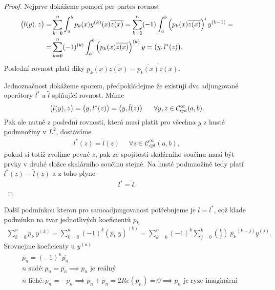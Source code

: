 \begin{proof}
Nejprve dokážeme pomocí per partes rovnost
\begin{align*}
\begin{split}
    \big( l(y), z \big) =& \sum_{k=0}^{n} \int_a^b p_k(x) y^{(k)}(x) \overline{z(x)} =
    \sum_{k=0}^{n} (-1) \int_a^b \left(p_k(x) \overline{z(x)}\right)' y^{(k-1)} = \\
    =& \sum_{k=0}^{n} (-1)^{(k)} \int_a^b \left(p_k(x) \overline{z(x)}\right)^{(k)} y =
    \big( y, l^*(z) \big).
\end{split}
\end{align*}
Poslední rovnost platí díky $p_k(x) \overline{z(x)}= \overline{\overline{p_k(x)} z(x)}$.

Jednoznačnost dokážeme sporem, předpokládejme že existují dva adjungované operátory $l^*$ a $\tilde{l}$ splňující rovnost. Máme
\begin{align*}
    \big( l(y), z \big) = \big( y, l^*(z) \big) = \big( y, \tilde{l}(z) \big) ~ ~ ~ ~ ~ \forall y, z \in \mathcal{C}^{\infty}_{cpt} (a,b).
\end{align*}
Pak ale nutně z poslední rovnosti, která musí platit pro všechna $y$ z husté podmnožiny v $L^2$, dostáváme
\begin{align*}
    l^*(z) = \tilde{l}(z) ~ ~ ~ ~ ~ ~ \forall z \in \mathcal{C}^{\infty}_{cpt} (a,b),
\end{align*}
pokud si totiž zvolíme pevné $z$, pak ze spojitosti skalárního součinu musí být prvky v druhé složce skalárního součinu stejné. Na husté podmnožině tedy platí $l^*(z) = \tilde{l}(z)$ a z toho plyne
\begin{align*}
    l^* = \tilde{l}.
\end{align*}
\end{proof}
Další podmínkou kterou pro samoadjungovanost potřebujeme je $l = l^*$, což klade podmínku na tvar jednotlivých koeficientů $p_k$
\begin{align*}
    \sum_{k=0}^{n} p_k ~ y^{(k)} = \sum_{k=0}^{n} (-1)^{k} \left(\overline{p_k} ~ y\right)^{(k)} = \sum_{k=0}^{n} (-1)^{k} \sum_{j=0}^{k} {k \choose j} ~ \overline{p_k}^{(k-j)} y^{(j)}.
\end{align*}
Srovnejme koeficienty u $y^{(n)}$
\begin{align*}
    \begin{split}
        &p_n = (-1)^{n} \overline{p_n} \\
        &\text{$n$ sudé} : p_n = \overline{p_n} \implies \text{$p_n$ je reálný} \\
        &\text{$n$ liché} : p_n = - \overline{p_n} \implies p_n + \overline{p_n} = 2 Re (p_n) = 0 \implies \text{$p_n$ je ryze imaginární}
    \end{split}
\end{align*}
